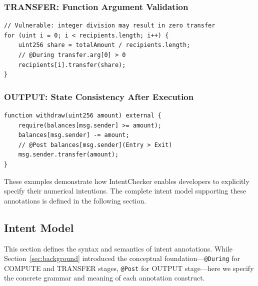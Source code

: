 \documentclass[pdflatex,sn-basic]{sn-jnl}%
\theoremstyle{thmstyleone}%
\theoremstyle{thmstyletwo}%
\theoremstyle{thmstylethree}%
\begin{document}

\subsubsection{TRANSFER: Function Argument Validation}


\begin{lstlisting}[caption={Example: Ensuring non-zero transfer amounts}, label={lst:transfer-example}]
// Vulnerable: integer division may result in zero transfer
for (uint i = 0; i < recipients.length; i++) {
    uint256 share = totalAmount / recipients.length;
    // @During transfer.arg[0] > 0
    recipients[i].transfer(share);
}
\end{lstlisting}


\subsubsection{OUTPUT: State Consistency After Execution}


\begin{lstlisting}[caption={Example: Verifying balance consistency}, label={lst:output-example}]
function withdraw(uint256 amount) external {
    require(balances[msg.sender] >= amount);
    balances[msg.sender] -= amount;
    // @Post balances[msg.sender](Entry > Exit)
    msg.sender.transfer(amount);
}
\end{lstlisting}


\smallskip
These examples demonstrate how IntentChecker enables developers to explicitly specify their numerical intentions.
The complete intent model supporting these annotations is defined in the following section.

\subsection{Intent Model}

This section defines the syntax and semantics of intent annotations.
While Section~\ref{sec:background} introduced the conceptual foundation---\texttt{@During} for COMPUTE and TRANSFER stages, \texttt{@Post} for OUTPUT stage---here we specify the concrete grammar and meaning of each annotation construct.
\end{document}
